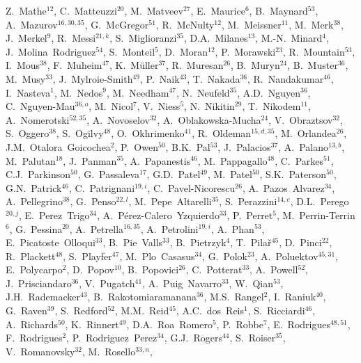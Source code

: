 \documentclass[12pt,a4paper]{article}
\begin{document}
\begin{titlepage}
\begin{center}
\begin{flushleft}
Z.~Mathe$^{12}$, 
C.~Matteuzzi$^{20}$, 
M.~Matveev$^{27}$, 
E.~Maurice$^{6}$, 
B.~Maynard$^{53}$, 
A.~Mazurov$^{16,30,35}$, 
G.~McGregor$^{51}$, 
R.~McNulty$^{12}$, 
M.~Meissner$^{11}$, 
M.~Merk$^{38}$, 
J.~Merkel$^{9}$, 
R.~Messi$^{21,k}$, 
S.~Miglioranzi$^{35}$, 
D.A.~Milanes$^{13}$, 
M.-N.~Minard$^{4}$, 
J.~Molina~Rodriguez$^{54}$, 
S.~Monteil$^{5}$, 
D.~Moran$^{12}$, 
P.~Morawski$^{23}$, 
R.~Mountain$^{53}$, 
I.~Mous$^{38}$, 
F.~Muheim$^{47}$, 
K.~M\"{u}ller$^{37}$, 
R.~Muresan$^{26}$, 
B.~Muryn$^{24}$, 
B.~Muster$^{36}$, 
M.~Musy$^{33}$, 
J.~Mylroie-Smith$^{49}$, 
P.~Naik$^{43}$, 
T.~Nakada$^{36}$, 
R.~Nandakumar$^{46}$, 
I.~Nasteva$^{1}$, 
M.~Nedos$^{9}$, 
M.~Needham$^{47}$, 
N.~Neufeld$^{35}$, 
A.D.~Nguyen$^{36}$, 
C.~Nguyen-Mau$^{36,o}$, 
M.~Nicol$^{7}$, 
V.~Niess$^{5}$, 
N.~Nikitin$^{29}$, 
T.~Nikodem$^{11}$, 
A.~Nomerotski$^{52,35}$, 
A.~Novoselov$^{32}$, 
A.~Oblakowska-Mucha$^{24}$, 
V.~Obraztsov$^{32}$, 
S.~Oggero$^{38}$, 
S.~Ogilvy$^{48}$, 
O.~Okhrimenko$^{41}$, 
R.~Oldeman$^{15,d,35}$, 
M.~Orlandea$^{26}$, 
J.M.~Otalora~Goicochea$^{2}$, 
P.~Owen$^{50}$, 
B.K.~Pal$^{53}$, 
J.~Palacios$^{37}$, 
A.~Palano$^{13,b}$, 
M.~Palutan$^{18}$, 
J.~Panman$^{35}$, 
A.~Papanestis$^{46}$, 
M.~Pappagallo$^{48}$, 
C.~Parkes$^{51}$, 
C.J.~Parkinson$^{50}$, 
G.~Passaleva$^{17}$, 
G.D.~Patel$^{49}$, 
M.~Patel$^{50}$, 
S.K.~Paterson$^{50}$, 
G.N.~Patrick$^{46}$, 
C.~Patrignani$^{19,i}$, 
C.~Pavel-Nicorescu$^{26}$, 
A.~Pazos~Alvarez$^{34}$, 
A.~Pellegrino$^{38}$, 
G.~Penso$^{22,l}$, 
M.~Pepe~Altarelli$^{35}$, 
S.~Perazzini$^{14,c}$, 
D.L.~Perego$^{20,j}$, 
E.~Perez~Trigo$^{34}$, 
A.~P\'{e}rez-Calero~Yzquierdo$^{33}$, 
P.~Perret$^{5}$, 
M.~Perrin-Terrin$^{6}$, 
G.~Pessina$^{20}$, 
A.~Petrella$^{16,35}$, 
A.~Petrolini$^{19,i}$, 
A.~Phan$^{53}$, 
E.~Picatoste~Olloqui$^{33}$, 
B.~Pie~Valls$^{33}$, 
B.~Pietrzyk$^{4}$, 
T.~Pila\v{r}$^{45}$, 
D.~Pinci$^{22}$, 
R.~Plackett$^{48}$, 
S.~Playfer$^{47}$, 
M.~Plo~Casasus$^{34}$, 
G.~Polok$^{23}$, 
A.~Poluektov$^{45,31}$, 
E.~Polycarpo$^{2}$, 
D.~Popov$^{10}$, 
B.~Popovici$^{26}$, 
C.~Potterat$^{33}$, 
A.~Powell$^{52}$, 
J.~Prisciandaro$^{36}$, 
V.~Pugatch$^{41}$, 
A.~Puig~Navarro$^{33}$, 
W.~Qian$^{53}$, 
J.H.~Rademacker$^{43}$, 
B.~Rakotomiaramanana$^{36}$, 
M.S.~Rangel$^{2}$, 
I.~Raniuk$^{40}$, 
G.~Raven$^{39}$, 
S.~Redford$^{52}$, 
M.M.~Reid$^{45}$, 
A.C.~dos~Reis$^{1}$, 
S.~Ricciardi$^{46}$, 
A.~Richards$^{50}$, 
K.~Rinnert$^{49}$, 
D.A.~Roa~Romero$^{5}$, 
P.~Robbe$^{7}$, 
E.~Rodrigues$^{48,51}$, 
F.~Rodrigues$^{2}$, 
P.~Rodriguez~Perez$^{34}$, 
G.J.~Rogers$^{44}$, 
S.~Roiser$^{35}$, 
V.~Romanovsky$^{32}$, 
M.~Rosello$^{33,n}$, 

\end{flushleft}
\end{center}
\end{titlepage}
\end{document}
